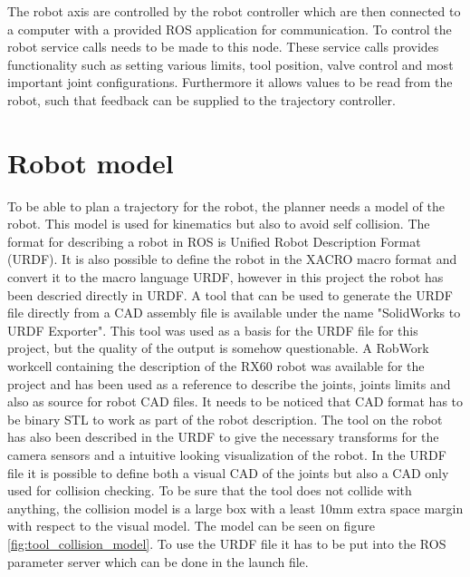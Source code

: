 
The robot axis are controlled by the robot controller which are then connected to a computer with a provided ROS application for communication. To control the robot service calls needs to be made to this node. These service calls provides functionality such as setting various limits, tool position, valve control and most important joint configurations. Furthermore it allows values to be read from the robot, such that feedback can be supplied to the trajectory controller.

\section{Robot model}
\label{sec:robot_model}
To be able to plan a trajectory for the robot, the planner needs a model of the robot. This model is used for kinematics but also to avoid self collision. The format for describing a robot in ROS is Unified Robot Description Format (URDF). It is also possible to define the robot in the XACRO macro format and convert it to the macro language URDF, however in this project the robot has been descried directly in URDF.
A tool that can be used to generate the URDF file directly from a CAD assembly file is available under the name "SolidWorks to URDF Exporter". This tool was used as a basis for the URDF file for this project, but the quality of the output is somehow questionable. A RobWork workcell containing the description of the RX60 robot was available for the project and has been used as a reference to describe the joints, joints limits and also as source for robot CAD files. It needs to be noticed that CAD format has to be binary STL to work as part of the robot description. The tool on the robot has also been described in the URDF to give the necessary transforms for the camera sensors and a intuitive looking visualization of the robot. In the URDF file it is possible to define both a visual CAD of the joints but also a CAD only used for collision checking. To be sure that the tool does not collide with anything, the collision model is a large box with a least 10mm extra space margin with respect to the visual model. The model can be seen on figure \ref{fig:tool_collision_model}. To use the URDF file it has to be put into the ROS parameter server which can be done in the launch file.

